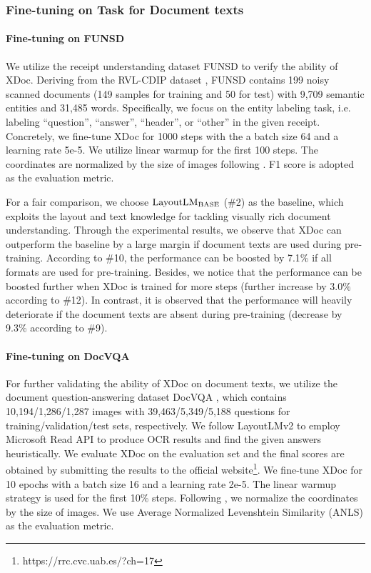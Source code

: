 \documentclass[11pt]{article}
\begin{document}
\subsubsection{Fine-tuning on Task for Document texts}

\paragraph{Fine-tuning on FUNSD}
We utilize the receipt understanding dataset FUNSD \cite{jaume2019funsd} to verify the ability of XDoc. Deriving from the RVL-CDIP dataset \cite{harley2015evaluation}, FUNSD contains 199 noisy scanned documents (149 samples for training and 50 for test) with 9,709 semantic entities and 31,485 words. Specifically, we focus on the entity labeling task, i.e. labeling ``question'', ``answer'', ``header'', or ``other'' in the given receipt. Concretely, we fine-tune XDoc for 1000 steps with the a batch size 64 and a learning rate 5e-5. We utilize linear warmup for the first 100 steps. The coordinates are normalized by the size of images following \cite{xu2020layoutlm}. F1 score is adopted as the evaluation metric.

For a fair comparison, we choose ${\rm LayoutLM_{BASE}}$ (\#2) \cite{xu2020layoutlm} as the baseline, which exploits the layout and text knowledge for tackling visually rich document understanding. Through the experimental results, we observe that XDoc can outperform the baseline by a large margin if document texts are used during pre-training. According to \#10, the performance can be boosted by 7.1\% if all formats are used for pre-training. Besides, we notice that the performance can be boosted further when XDoc is trained for more steps (further increase by 3.0\% according to \#12). In contrast, it is observed that the performance will heavily deteriorate if the document texts are absent during pre-training (decrease by 9.3\% according to \#9).

\paragraph{Fine-tuning on DocVQA}
For further validating the ability of XDoc on document texts, we utilize the document question-answering dataset DocVQA \cite{mathew2021docvqa}, which contains 10,194/1,286/1,287 images with 39,463/5,349/5,188 questions for training/validation/test sets, respectively. We follow LayoutLMv2 \cite{xu2020layoutlmv2} to employ Microsoft Read API to produce OCR results and find the given answers heuristically. We evaluate XDoc on the evaluation set and the final scores are obtained by submitting the results to the official website\footnote{https://rrc.cvc.uab.es/?ch=17}. We fine-tune XDoc for 10 epochs with a batch size 16 and a learning rate 2e-5. The linear warmup strategy is used for the first 10\% steps. Following \cite{xu2020layoutlm}, we normalize the coordinates by the size of images. We use Average Normalized Levenshtein Similarity (ANLS) as the evaluation metric.
\end{document}
